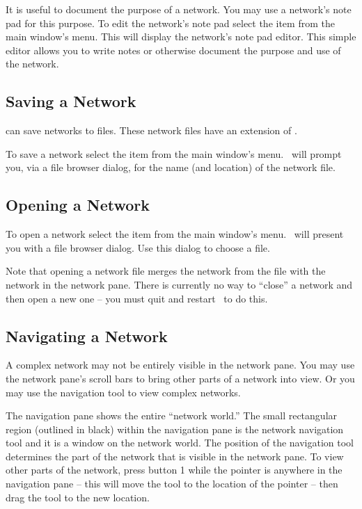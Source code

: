 It is useful to document the purpose of a network.  You may use a network's
note pad for this purpose.  To edit the network's note pad select the
 item from the main window's  menu.  This
will display the network's note pad editor.  This simple editor allows you
to write notes or otherwise document the purpose and use of the network.


\subsection{Saving a Network}
\label{sec:savenet}

\sr can save networks to files.  These network files have an extension of
.  

To save a network select the  item from the main window's
 menu.  \sr\ will prompt you, via a file browser dialog, for the
name (and location) of the network file.


\subsection{Opening a Network}
\label{sec:opennet}

To open a network select the  item from the main window's
 menu.  \sr\ will present you with a file browser dialog.
Use this dialog to choose a  file.

Note that opening a network file merges the network from the file with the
network in the network pane.  There is currently no way to ``close'' a
network and then open a new one -- you must quit and restart \sr\ to do
this.

\subsection{Navigating a Network}
\label{sec:navnetwork}

A complex network may not be entirely visible in the network pane.  You may
use the network pane's scroll bars to bring other parts of a network into
view.  Or you may use the navigation tool to view complex networks.

The navigation pane shows the entire ``network world.''  The small
rectangular region (outlined in black) within the navigation pane is the
network navigation tool and it is a window on the network world.  The
position of the navigation tool determines the part of the network that is
visible in the network pane.  To view other parts of the network, press
button 1 while the pointer is anywhere in the navigation pane -- this will
move the tool to the location of the pointer --  then drag the tool to the
new location.



